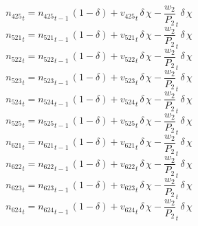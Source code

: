 \begin{dmath}
{{n_{425}}}_{t}={{n_{425}}}_{t-1}\, \left(1-{{\delta}}\right)+{{v_{425}}}_{t}\, {{\delta}}\, {{\chi}}-{{\frac{w_{2}}{P_{2}}}}_{t}\, {{\delta}}\, {{\chi}}
\end{dmath}
\begin{dmath}
{{n_{521}}}_{t}={{n_{521}}}_{t-1}\, \left(1-{{\delta}}\right)+{{v_{521}}}_{t}\, {{\delta}}\, {{\chi}}-{{\frac{w_{2}}{P_{2}}}}_{t}\, {{\delta}}\, {{\chi}}
\end{dmath}
\begin{dmath}
{{n_{522}}}_{t}={{n_{522}}}_{t-1}\, \left(1-{{\delta}}\right)+{{v_{522}}}_{t}\, {{\delta}}\, {{\chi}}-{{\frac{w_{2}}{P_{2}}}}_{t}\, {{\delta}}\, {{\chi}}
\end{dmath}
\begin{dmath}
{{n_{523}}}_{t}={{n_{523}}}_{t-1}\, \left(1-{{\delta}}\right)+{{v_{523}}}_{t}\, {{\delta}}\, {{\chi}}-{{\frac{w_{2}}{P_{2}}}}_{t}\, {{\delta}}\, {{\chi}}
\end{dmath}
\begin{dmath}
{{n_{524}}}_{t}={{n_{524}}}_{t-1}\, \left(1-{{\delta}}\right)+{{v_{524}}}_{t}\, {{\delta}}\, {{\chi}}-{{\frac{w_{2}}{P_{2}}}}_{t}\, {{\delta}}\, {{\chi}}
\end{dmath}
\begin{dmath}
{{n_{525}}}_{t}={{n_{525}}}_{t-1}\, \left(1-{{\delta}}\right)+{{v_{525}}}_{t}\, {{\delta}}\, {{\chi}}-{{\frac{w_{2}}{P_{2}}}}_{t}\, {{\delta}}\, {{\chi}}
\end{dmath}
\begin{dmath}
{{n_{621}}}_{t}={{n_{621}}}_{t-1}\, \left(1-{{\delta}}\right)+{{v_{621}}}_{t}\, {{\delta}}\, {{\chi}}-{{\frac{w_{2}}{P_{2}}}}_{t}\, {{\delta}}\, {{\chi}}
\end{dmath}
\begin{dmath}
{{n_{622}}}_{t}={{n_{622}}}_{t-1}\, \left(1-{{\delta}}\right)+{{v_{622}}}_{t}\, {{\delta}}\, {{\chi}}-{{\frac{w_{2}}{P_{2}}}}_{t}\, {{\delta}}\, {{\chi}}
\end{dmath}
\begin{dmath}
{{n_{623}}}_{t}={{n_{623}}}_{t-1}\, \left(1-{{\delta}}\right)+{{v_{623}}}_{t}\, {{\delta}}\, {{\chi}}-{{\frac{w_{2}}{P_{2}}}}_{t}\, {{\delta}}\, {{\chi}}
\end{dmath}
\begin{dmath}
{{n_{624}}}_{t}={{n_{624}}}_{t-1}\, \left(1-{{\delta}}\right)+{{v_{624}}}_{t}\, {{\delta}}\, {{\chi}}-{{\frac{w_{2}}{P_{2}}}}_{t}\, {{\delta}}\, {{\chi}}
\end{dmath}
